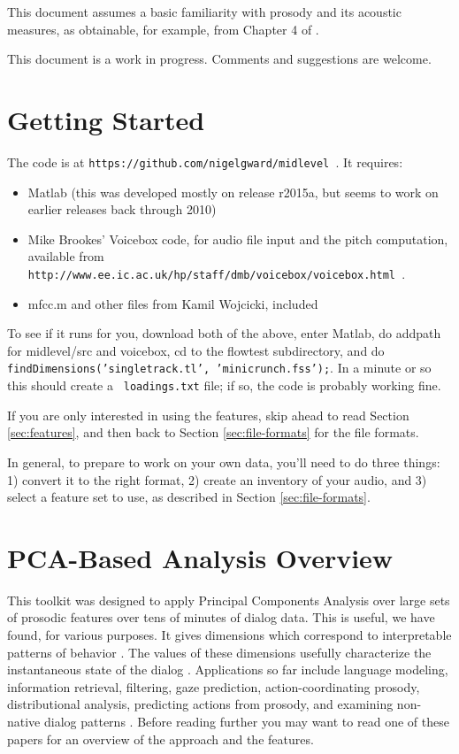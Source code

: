\documentclass[11pt]{article}
\begin{document}
This document assumes a basic familiarity with prosody and its
acoustic measures, as obtainable, for example, from Chapter 4 of
\cite{ladefoged03}.

This document is a work in progress.  Comments and suggestions are
welcome.


\section{Getting Started}

The code is at {\tt https://github.com/nigelgward/midlevel }.  It requires:
\begin{itemize}\setlength{\itemsep}{0pt}\setlength{\parskip}{0pt}
\item Matlab (this was developed mostly on release r2015a, but seems
  to work on earlier releases back through 2010)
\item Mike Brookes' Voicebox code, for audio file input and the pitch
  computation, available from {\tt
    http://www.ee.ic.ac.uk/hp/staff/dmb/voicebox/voicebox.html }.
\item mfcc.m and other files from Kamil Wojcicki, included 
\end{itemize}

To see if it runs for you, download both of the above, enter Matlab,
do addpath for midlevel/src and voicebox, cd to the flowtest
subdirectory, and do {\tt findDimensions('singletrack.tl',
  'minicrunch.fss');}. In a minute or so this should create a {\tt
  loadings.txt} file; if so, the code is probably working fine.

If you are only interested in using the features, skip ahead to read
Section \ref{sec:features}, and then back to Section
\ref{sec:file-formats} for the file formats.

In general, to prepare to work on your own data, you'll need to do
three things: 1) convert it to the right format, 2) create an
inventory of your audio, and 3) select a feature set to use, as
described in Section \ref{sec:file-formats}.


\section{PCA-Based Analysis Overview }

This toolkit was designed to apply Principal Components Analysis over
large sets of prosodic features over tens of minutes of dialog data.
This is useful, we have found, for various purposes.  It gives
dimensions which correspond to interpretable patterns of behavior
\cite{prosodic-elements}.  The values of these dimensions usefully
characterize the instantaneous state of the dialog
\cite{dialog-dimensions}.  Applications so far include language
modeling, information retrieval, filtering, gaze prediction,
action-coordinating prosody, distributional analysis, predicting
actions from prosody, and examining non-native dialog patterns
\cite{pca-lm,prosody-ir,sigdial-codec,ward-gaze,ward-abu,dimensions-uh-huh,l2english}.
Before reading further you may want to read one of these papers for an
overview of the approach and the features.
\end{document}
